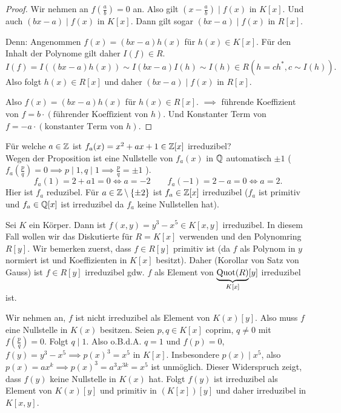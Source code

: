 \begin{proof}
	Wir nehmen an $f(\frac{a}{b}) = 0$ an. Also gilt $(x-\frac{a}{b}) \mid f(x)$ in  $K[x]$.
	Und auch $(bx-a) \mid f(x)$ in $K[x]$. Dann gilt sogar $(bx-a) \mid f(x) $ in $R[x]$.

	Denn: Angenommen $f(x) = (bx-a) h(x)$ für $h(x) \in K[x]$.
	Für den Inhalt der Polynome gilt daher $I(f) \in R$.
	\[
		I(f) = I((bx-a) h(x)) \sim I(bx-a) I(h) \sim I(h) \in R (h = c h^{*}, c \sim I(h))
	.\] 
	Also folgt $h(x) \in R[x]$ und daher $(bx-a) \mid f(x)$ in $R[x]$.

	Also $f(x) = (bx-a) h(x)$ für $h(x) \in R[x]$.
	$\implies$ führende Koeffizient von $f = b \cdot ( \text{führender Koeffizient von }h)$. 
	Und Konstanter Term von $f = -a \cdot (\text{konstanter Term von } h)$.
\end{proof}

\begin{eg}
	Für welche $a \in \mathbb{Z}$ ist $f_{a}(x) = x^2 + ax +1 \in \mathbb{Z}[x]$ irreduzibel?\\
	Wegen der Proposition ist eine Nullstelle von $f_{a}(x)$ in $\mathbb{Q}$ automatisch $\pm 1$ ($f_{a}(\frac{p}{q}) = 0 \implies p \mid 1, q \mid 1 \implies \frac{p}{q} = \pm 1$ ).
	\[
		f_{a}(1) = 2 + a 1 = 0 \Leftrightarrow a = -2 \qquad f_{a}(-1) = 2-a = 0 \Leftrightarrow a = 2
	.\] 
	Hier ist $f_{a}$ reduzibel.
	Für $a \in \mathbb{Z} \setminus \{\pm 2\}$ ist $f_{a} \in \mathbb{Z}[x]$ irreduzibel ($f_{a}$ ist primitiv und $f_{a} \in \mathbb{Q}[x]$ ist irreduzibel da $f_{a}$ keine Nullstellen hat).
\end{eg}

\begin{eg}
	Sei $K$ ein Körper. Dann ist $f(x,y) = y^3 - x^{5} \in K[x,y]$ irreduzibel.
	In diesem Fall wollen wir das Diskutierte für $R = K[x]$ verwenden und den Polynomring $R[y]$.
	Wir bemerken zuerst, dass $f \in R[y]$ primitiv ist (da $f$ als Polynom in $y$ normiert ist und Koeffizienten in $K[x]$ besitzt).
	Daher (Korollar von Satz von Gauss) ist $f \in R[y]$ irreduzibel gdw. $f$ als Element von $\underbrace{\operatorname{Quot}(R)}_{K[x]}[y]$ irreduzibel ist.

	Wir nehmen an, $f$ ist nicht irreduzibel als Element von $K(x)[y]$.
	Also muss $f$ eine Nullstelle in $K (x)$ besitzen. Seien $p,q \in K[x]$ coprim, $q \neq 0$ mit $f(\frac{p}{q}) = 0$.
	Folgt $q \mid 1$. Also o.B.d.A. $q = 1$ und $f(p) = 0$, $f(y) = y^3 - x^{5} \implies p(x)^3 = x^{5}$ in $K[x]$.
	Insbesondere $p(x) \mid x^{5}$, also $p(x) = a x^{k} \implies p(x)^3 = a^3 x^{3k} = x^{5}$ ist unmöglich.
	Dieser Widerspruch zeigt, dass $f(y)$ keine Nullstelle in $K(x)$ hat.
	Folgt $f(y)$ ist irreduzibel als Element von $K(x)[y]$ und primitiv in $(K[x])[y]$ und daher irreduzibel in $K[x,y]$.
\end{eg}

